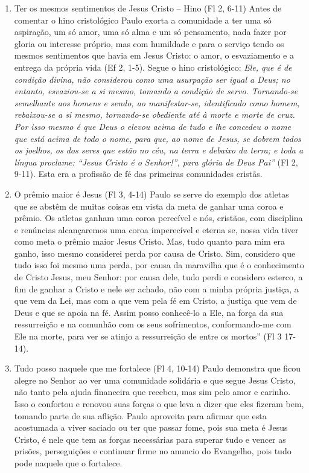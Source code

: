 \documentclass[
]{book}
\begin{document}
\begin{enumerate}
\def\labelenumi{\arabic{enumi}.}
\item
  Ter os mesmos sentimentos de Jesus Cristo -- Hino (Fl 2, 6-11)
  Antes de comentar o hino cristológico Paulo exorta a comunidade a ter uma só aspiração, um só amor, uma só alma e um só pensamento, nada fazer por gloria ou interesse próprio, mas com humildade e para o serviço tendo os mesmos sentimentos que havia em Jesus Cristo: o amor, o esvaziamento e a entrega da própria vida (Ef 2, 1-5). Segue o hino cristológico: \emph{Ele, que é de condição divina, não considerou como uma usurpação ser igual a Deus; no entanto, esvaziou-se a si mesmo, tomando a condição de servo. Tornando-se semelhante aos homens e sendo, ao manifestar-se, identificado como homem, rebaixou-se a si mesmo, tornando-se obediente até à morte e morte de cruz. Por isso mesmo é que Deus o elevou acima de tudo e lhe concedeu o nome que está acima de todo o nome, para que, ao nome de Jesus, se dobrem todos os joelhos, os dos seres que estão no céu, na terra e debaixo da terra; e toda a língua proclame: ``Jesus Cristo é o Senhor!'', para glória de Deus Pai''} (Fl 2, 9-11). Esta era a profissão de fé das primeiras comunidades cristãs.
\item
  O prêmio maior é Jesus (Fl 3, 4-14)
  Paulo se serve do exemplo dos atletas que se abstêm de muitas coisas em vista da meta de ganhar uma coroa e prêmio. Os atletas ganham uma coroa perecível e nós, cristãos, com disciplina e renúncias alcançaremos uma coroa imperecível e eterna se, nossa vida tiver como meta o prêmio maior Jesus Cristo. Mas, tudo quanto para mim era ganho, isso mesmo considerei perda por causa de Cristo. Sim, considero que tudo isso foi mesmo uma perda, por causa da maravilha que é o conhecimento de Cristo Jesus, meu Senhor: por causa dele, tudo perdi e considero esterco, a fim de ganhar a Cristo e nele ser achado, não com a minha própria justiça, a que vem da Lei, mas com a que vem pela fé em Cristo, a justiça que vem de Deus e que se apoia na fé. Assim posso conhecê-lo a Ele, na força da sua ressurreição e na comunhão com os seus sofrimentos, conformando-me com Ele na morte, para ver se atinjo a ressurreição de entre os mortos'' (Fl 3 17-14).
\item
  Tudo posso naquele que me fortalece (Fl 4, 10-14)
  Paulo demonstra que ficou alegre no Senhor ao ver uma comunidade solidária e que segue Jesus Cristo, não tanto pela ajuda financeira que recebeu, mas sim pelo amor e carinho. Isso o confortou e renovou suas forças o que leva a dizer que eles fizeram bem, tomando parte de sua aflição. Paulo aproveita para afirmar que esta acostumada a viver saciado ou ter que passar fome, pois sua meta é Jesus Cristo, é nele que tem as forças necessárias para superar tudo e vencer as prisões, perseguições e continuar firme no anuncio do Evangelho, pois tudo pode naquele que o fortalece.
\end{enumerate}
\end{document}
